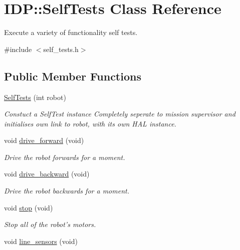 \hypertarget{classIDP_1_1SelfTests}{
\section{IDP::SelfTests Class Reference}
\label{classIDP_1_1SelfTests}
}


Execute a variety of functionality self tests.  




{\ttfamily \#include $<$self\_\-tests.h$>$}

\subsection*{Public Member Functions}
\begin{DoxyCompactItemize}
\item 
\hyperlink{classIDP_1_1SelfTests_a6864b03502cc5d1ac3728b456b04238f}{SelfTests} (int robot)
\begin{DoxyCompactList}\small\item\em Constuct a SelfTest instance Completely seperate to mission supervisor and initialises own link to robot, with its own HAL instance. \item\end{DoxyCompactList}\item 
void \hyperlink{classIDP_1_1SelfTests_a4ff456e74d55e13599cf64db76bd2ed4}{drive\_\-forward} (void)
\begin{DoxyCompactList}\small\item\em Drive the robot forwards for a moment. \item\end{DoxyCompactList}\item 
void \hyperlink{classIDP_1_1SelfTests_a38ddef7ecdf9b7dfa69d689c9c1ac8ca}{drive\_\-backward} (void)
\begin{DoxyCompactList}\small\item\em Drive the robot backwards for a moment. \item\end{DoxyCompactList}\item 
void \hyperlink{classIDP_1_1SelfTests_a33adf462d8c408b1c7b4858e9a4ff000}{stop} (void)
\begin{DoxyCompactList}\small\item\em Stop all of the robot's motors. \item\end{DoxyCompactList}\item 
void \hyperlink{classIDP_1_1SelfTests_aa73ad4de6c1d2b725ed796c10f54ab7c}{line\_\-sensors} (void)

\end{DoxyCompactItemize}
